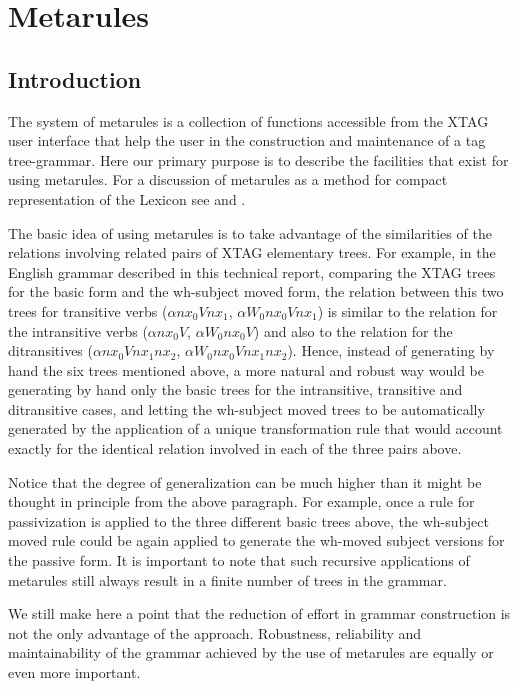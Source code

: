 \chapter{Metarules} 
\label{metarules} 
 
\section{Introduction} 
\label{introduction} 
 
The system of metarules is a collection of functions accessible from the XTAG 
user interface that help the user in the construction and maintenance of a tag 
tree-grammar.  Here our primary purpose is to describe the facilities that 
exist for using metarules.  For a discussion of metarules as a method for 
compact representation of the Lexicon see \cite{becker93} and \cite{srini94}. 
 
The basic idea of using metarules is to take advantage of the similarities of 
the relations involving related pairs of XTAG elementary trees.  For example, 
in the English grammar described in this technical report, comparing the XTAG 
trees for the basic form and the wh-subject moved form, the relation between 
this two trees for transitive verbs ($\alpha nx_0Vnx_1$, $\alpha W_0nx_0Vnx_1$) 
is similar to the relation for the intransitive verbs ($\alpha nx_0V$, $\alpha 
W_0nx_0V$) and also to the relation for the ditransitives ($\alpha 
nx_0Vnx_1nx_2$, $\alpha W_0nx_0Vnx_1nx_2$). Hence, instead of generating by 
hand the six trees mentioned above, a more natural and robust way would be 
generating by hand only the basic trees for the intransitive, transitive and 
ditransitive cases, and letting the wh-subject moved trees to be automatically 
generated by the application of a unique transformation rule that would account 
exactly for the identical relation involved in each of the three pairs above. 
 
Notice that the degree of generalization can be much higher than it might be 
thought in principle from the above paragraph. For example, once a rule for 
passivization is applied to the three different basic trees above, the 
wh-subject moved rule could be again applied to generate the wh-moved subject 
versions for the passive form. It is important to note that such recursive 
applications of metarules still always result in a finite number of trees in 
the grammar. 
 
 
We still make here a point that the reduction of effort in grammar construction 
is not the only advantage of the approach. Robustness, 
reliability and maintainability of the grammar achieved by the use of  
metarules are equally or even more important. 
 
